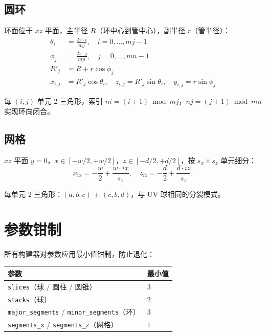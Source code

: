 \documentclass[11pt,a4paper]{article}
\begin{document}
\subsection{圆环}

环面位于 $xz$ 平面，主半径 $R$（环中心到管中心），副半径 $r$（管半径）：
\begin{align}
  \theta_i &= \frac{2\pi \cdot i}{mj},\quad i = 0, \dots, mj - 1 \\
  \phi_j &= \frac{2\pi \cdot j}{mn},\quad j = 0, \dots, mn - 1 \\
  R'_{j} &= R + r \cos\phi_j \\
  x_{i,j} &= R'_j \cos\theta_i,\quad
  z_{i,j} = R'_j \sin\theta_i,\quad
  y_{i,j} = r \sin\phi_j
\end{align}

每 $(i, j)$ 单元 2 三角形，索引 $ni = (i+1) \bmod mj$，$nj = (j+1) \bmod mn$ 实现环向闭合。

\subsection{网格}

$xz$ 平面 $y = 0$，$x \in [-w/2, +w/2]$，$z \in [-d/2, +d/2]$，按 $s_x \times s_z$ 单元细分：
\[
  x_{ix} = -\frac{w}{2} + \frac{w \cdot ix}{s_x},\quad
  z_{iz} = -\frac{d}{2} + \frac{d \cdot iz}{s_z}.
\]

每单元 2 三角形：$(a, b, c)$ + $(c, b, d)$，与 UV 球相同的分裂模式。

\section{参数钳制}

所有构建器对参数应用最小值钳制，防止退化：

\begin{center}
\renewcommand{\arraystretch}{1.18}
\begin{tabular}{@{}ll@{}}
  \toprule
  \textbf{参数} & \textbf{最小值} \\
  \midrule
  \texttt{slices}（球 / 圆柱 / 圆锥） & $3$ \\
  \texttt{stacks}（球）                & $2$ \\
  \texttt{major\_segments} / \texttt{minor\_segments}（环） & $3$ \\
  \texttt{segments\_x} / \texttt{segments\_z}（网格）       & $1$ \\
  \bottomrule
\end{tabular}
\end{center}
\end{document}
